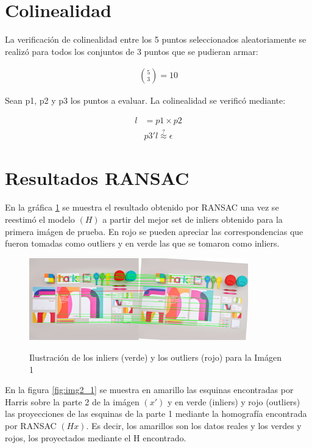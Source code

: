 \documentclass{IEEEtran}
\begin{document}
\section{Colinealidad}

La verificación de colinealidad entre los 5 puntos seleccionados
aleatoriamente se realizó para todos los conjuntos de 3 puntos
que se pudieran armar:

\begin{equation*}
\begin{aligned}
\binom{5}{3} = 10
\end{aligned}
\end{equation*} 

Sean p1, p2 y p3 los puntos a evaluar. La colinealidad se verificó
mediante:

\begin{equation*}
\begin{aligned}
l &= p1 \times p2 \\
&p3'l \stackrel{?}{\approx} \epsilon
\end{aligned}
\end{equation*} 

\section{Resultados RANSAC}

En la gráfica \ref{fig:bigimg_1} se muestra el resultado
obtenido por RANSAC una vez se reestimó el modelo $(H)$
a partir del mejor set de inliers obtenido para la 
primera imágen de prueba.
En rojo se pueden apreciar las correspondencias que fueron
tomadas como outliers y en verde las que se tomaron como
inliers.

\begin{figure}[H]
\caption{Ilustración de los inliers (verde) y los outliers (rojo) para la Imágen 1}
\centering
\includegraphics[width=9.5cm,natwidth=1200,natheight=450]{figs/bigimg_1.png}
\label{fig:bigimg_1}
\end{figure}

En la figura \ref{fig:img2_1} se muestra en amarillo las esquinas 
encontradas por Harris sobre la parte 2 de la imágen $(x')$ 
y en verde (inliers) y rojo (outliers) las proyecciones de las esquinas de la parte 1 mediante
la homografía encontrada por RANSAC $(Hx)$. Es decir, los amarillos son los datos
reales y los verdes y rojos, los proyectados mediante el H encontrado.
\end{document}
